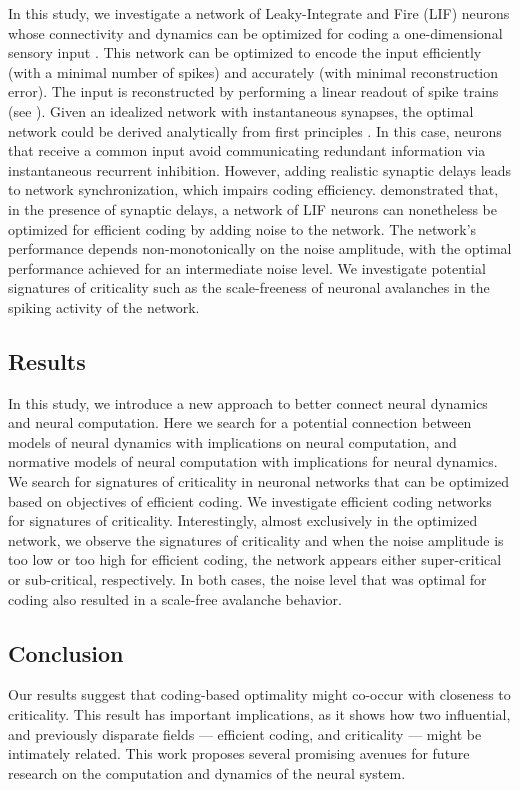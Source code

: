 In this study, we investigate a network of Leaky-Integrate and Fire (LIF) neurons whose connectivity and dynamics can be optimized for coding a one-dimensional sensory input \cite{chalkNeuralOscillationsSignature2016}.
This network can be optimized to encode the input efficiently
(\ie with a minimal number of spikes) and accurately (\ie with minimal reconstruction error).
The input is reconstructed by performing a linear readout of spike trains
(see \cite{boerlinPredictiveCodingDynamical2013}).
Given an idealized network with instantaneous synapses, the optimal network could be derived analytically from first principles \cite{boerlinPredictiveCodingDynamical2013}.
In this case, neurons that receive a common input avoid communicating redundant information via instantaneous recurrent inhibition.
However, adding realistic synaptic delays leads to network synchronization, which impairs coding efficiency.
\citet{chalkNeuralOscillationsSignature2016} demonstrated that, in the presence of synaptic delays, a network of LIF neurons can nonetheless be optimized for efficient coding by adding noise to the network.
The network's performance depends non-monotonically on the noise amplitude,
with the optimal performance achieved for an intermediate noise level. 
% 
We investigate potential signatures of criticality such as the scale-freeness of neuronal avalanches \cite{beggsNeuronalAvalanchesNeocortical2003} in the spiking activity of the network.


\subsection*{Results}

In this study, we introduce a new approach to better connect neural dynamics and neural computation.
Here we search for a potential connection between models of neural dynamics with implications on neural computation,
and normative models of neural computation with implications for neural dynamics.
We search for signatures of criticality in neuronal networks that can be optimized based on objectives of efficient coding. 
We investigate
efficient coding networks for signatures of criticality.
Interestingly, almost exclusively in the optimized network, we observe the signatures of criticality
and when the noise amplitude is too low or too high for efficient coding, the network appears either super-critical or sub-critical, respectively.
In both cases, the noise level that was optimal for coding also resulted in a scale-free avalanche behavior.

\subsection*{Conclusion}

Our results suggest that coding-based optimality might co-occur with closeness to criticality.
This result has important implications, as it shows how two influential,
and previously disparate fields --- efficient coding, and criticality --- might be intimately related.
This work proposes several promising avenues for future research on the computation and dynamics of the neural system.




